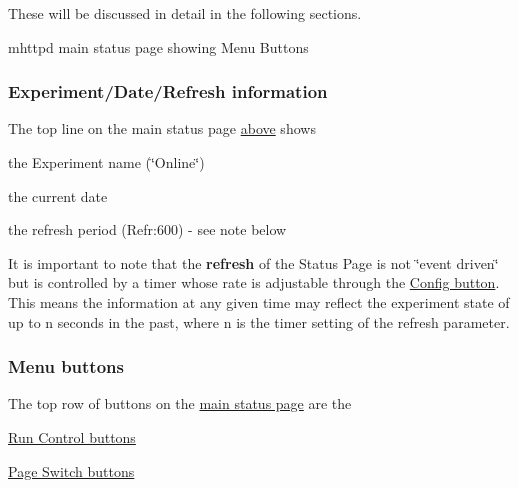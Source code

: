 These will be discussed in detail in the following sections. \par
 \label{RC_mhttpd_status_page_features_RC_mhttpd_main_status_new}
\hypertarget{RC_mhttpd_status_page_features_RC_mhttpd_main_status_new}{}
 \begin{center} mhttpd main status page showing Menu Buttons \par
\par
\par
  \end{center}  \par
\hypertarget{RC_mhttpd_status_page_features_RC_mhttpd_status_title}{}\subsubsection{Experiment/Date/Refresh information}\label{RC_mhttpd_status_page_features_RC_mhttpd_status_title}
The top line on the main status page \hyperlink{RC_mhttpd_status_page_features_RC_mhttpd_main_status_new}{above} shows
\begin{DoxyItemize}
\item the Experiment name (\char`\"{}Online\char`\"{})
\item the current date
\item the refresh period (Refr:600) -\/ see note below
\end{DoxyItemize}

It is important to note that the {\bfseries refresh} of the Status Page is not \char`\"{}event driven\char`\"{} but is controlled by a timer whose rate is adjustable through the \hyperlink{RC_mhttpd_status_page_features_RC_mhttpd_Config_button}{Config button}. This means the information at any given time may reflect the experiment state of up to n seconds in the past, where n is the timer setting of the refresh parameter.





\label{RC_mhttpd_status_page_features_idx_mhttpd_buttons_menu}
\hypertarget{RC_mhttpd_status_page_features_idx_mhttpd_buttons_menu}{}
 \hypertarget{RC_mhttpd_status_page_features_RC_mhttpd_status_menu_buttons}{}\subsubsection{Menu buttons}\label{RC_mhttpd_status_page_features_RC_mhttpd_status_menu_buttons}
The top row of buttons on the \hyperlink{RC_mhttpd_status_page_features_RC_mhttpd_main_status_new}{main status page} are the
\begin{DoxyItemize}
\item \hyperlink{RC_mhttpd_status_page_features_RC_mhttpd_status_RC_buttons}{Run Control buttons}
\item \hyperlink{RC_mhttpd_status_page_features_RC_mhttpd_status_Page_buttons}{Page Switch buttons}
\end{DoxyItemize}

